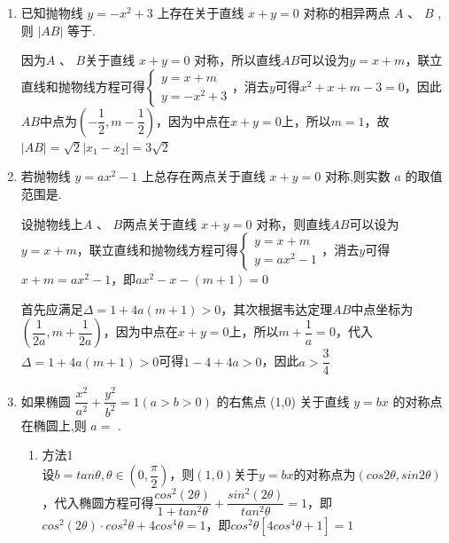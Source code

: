 \begin{enumerate}
\begin{jieda}
        因为双曲线上不存在这样的$P$点，所以这两条直线与双曲线没有交点，因此$\dfrac{b}{a} \leq 1$，故$e \in (1, \sqrt{2}]$
    \end{jieda}
    \item 已知抛物线 $y =  - {x}^{2} + 3$ 上存在关于直线 $x + y = 0$ 对称的相异两点 $A\text{ 、 }B$ ,则 $\left| {AB}\right|$ 等于.
    \begin{jieda}
        因为$A\text{ 、 }B$关于直线 $x + y = 0$ 对称，所以直线$AB$可以设为$y = x + m$，联立直线和抛物线方程可得$\left\{\begin{array}{l}
             y = x + m \\
             y = -x^2 + 3
        \end{array}\right.$，消去$y$可得$x^2 + x + m - 3 = 0$，因此$AB$中点为$\left(-\dfrac{1}{2}, m-\dfrac{1}{2}\right)$，因为中点在$x+y=0$上，所以$m = 1$，故$|AB| = \sqrt{2}|x_1-x_2| = 3\sqrt{2}$
    \end{jieda}
    \item 若抛物线 $y = a{x}^{2} - 1$ 上总存在两点关于直线 $x + y = 0$ 对称,则实数 $a$ 的取值范围是.
    \begin{jieda}
        设抛物线上$A\text{ 、 }B$两点关于直线 $x + y = 0$ 对称，则直线$AB$可以设为$y = x + m$，联立直线和抛物线方程可得$\left\{\begin{array}{l}
             y = x + m \\
             y = ax^2 - 1
        \end{array}\right.$，消去$y$可得$x + m = ax^2 - 1$，即$ax^2-x-(m+1) = 0$

        首先应满足$\Delta = 1+4a(m+1) > 0$，其次根据韦达定理$AB$中点坐标为$\left(\dfrac{1}{2a}, m+\dfrac{1}{2a}\right)$，因为中点在$x+y=0$上，所以$m + \dfrac{1}{a} = 0$，代入$\Delta = 1+4a(m+1) > 0$可得$1 - 4 + 4a > 0$，因此$a > \dfrac{3}{4}$
    \end{jieda}
    \item 如果椭圆 $\dfrac{{x}^{2}}{{a}^{2}} + \dfrac{{y}^{2}}{{b}^{2}} = 1\left( {a > b > 0}\right)$ 的右焦点 (1,0) 关于直线 $y = {bx}$ 的对称点在椭圆上,则 $a =$ .
    \begin{jieda}
        \begin{enumerate}
            \item 方法1 \\
            设$b = tan\theta, \theta \in \left(0, \dfrac{\pi}{2}\right)$，则$(1, 0)$关于$y = bx$的对称点为$(cos2\theta, sin2\theta)$，代入椭圆方程可得$\dfrac{cos^2(2\theta)}{1+tan^2\theta} + \dfrac{sin^2(2\theta)}{tan^2\theta} = 1$，即$cos^2(2\theta) \cdot cos^2\theta + 4cos^4\theta = 1$，即$cos^2\theta[4cos^4\theta+1] = 1$


\end{enumerate}
\end{jieda}
\end{enumerate}
